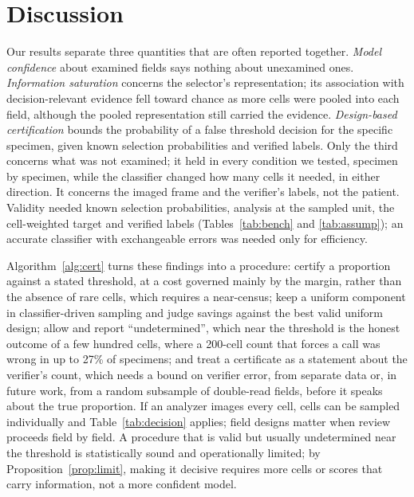 \documentclass[journal]{IEEEtran}
\begin{document}
\section{Discussion}
Our results separate three quantities that are often reported together. \emph{Model confidence} about examined fields says nothing about unexamined ones. \emph{Information saturation} concerns the selector's representation; its association with decision-relevant evidence fell toward chance as more cells were pooled into each field, although the pooled representation still carried the evidence. \emph{Design-based certification} bounds the probability of a false threshold decision for the specific specimen, given known selection probabilities and verified labels. Only the third concerns what was not examined; it held in every condition we tested, specimen by specimen, while the classifier changed how many cells it needed, in either direction. It concerns the imaged frame and the verifier's labels, not the patient. Validity needed known selection probabilities, analysis at the sampled unit, the cell-weighted target and verified labels (Tables~\ref{tab:bench} and \ref{tab:assump}); an accurate classifier with exchangeable errors was needed only for efficiency.

Algorithm~\ref{alg:cert} turns these findings into a procedure: certify a proportion against a stated threshold, at a cost governed mainly by the margin, rather than the absence of rare cells, which requires a near-census; keep a uniform component in classifier-driven sampling and judge savings against the best valid uniform design; allow and report ``undetermined'', which near the threshold is the honest outcome of a few hundred cells, where a 200-cell count that forces a call was wrong in up to 27\% of specimens; and treat a certificate as a statement about the verifier's count, which needs a bound on verifier error, from separate data or, in future work, from a random subsample of double-read fields, before it speaks about the true proportion. If an analyzer images every cell, cells can be sampled individually and Table~\ref{tab:decision} applies; field designs matter when review proceeds field by field. A procedure that is valid but usually undetermined near the threshold is statistically sound and operationally limited; by Proposition~\ref{prop:limit}, making it decisive requires more cells or scores that carry information, not a more confident model.
\end{document}
